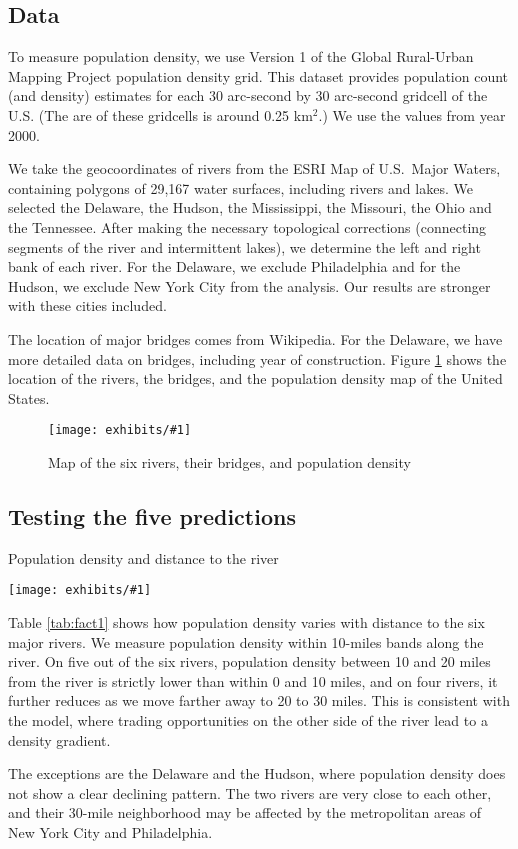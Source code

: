 \documentclass[12pt]{article}
\newcommand{\dofigure}[2]{\begin{figure}[h!]
\center %
\texttt{[image: exhibits/\#1]}
  \caption{#2\label{fig:#1}}
\end{figure}}
\newcommand{\dotable}[2]{\begin{table}[h!]
  \caption{#2\label{tab:#1}}
\center %
\texttt{[image: exhibits/\#1]}
\end{table}}
\begin{document}
\subsection{Data}

To measure population density, we use Version 1 of the Global Rural-Urban
Mapping Project population density grid. This dataset provides population
count (and density) estimates for each 30 arc-second by 30 arc-second
gridcell of the U.S. (The are of these gridcells is around 0.25 km${}^2$.) We use the values from year 2000.

We take the geocoordinates of rivers from the ESRI Map of U.S.~Major Waters,
containing polygons of 29,167 water surfaces, including rivers and lakes. We
selected the Delaware, the Hudson, the Mississippi, the Missouri, the Ohio
and the Tennessee. After making the necessary topological corrections
(connecting segments of the river and intermittent lakes), we determine the
left and right bank of each river. For the Delaware, we exclude Philadelphia
and for the Hudson, we exclude New York City from the analysis. Our results
are stronger with these cities included.

The location of major bridges comes from Wikipedia. For the Delaware, we
have more detailed data on bridges, including year of construction. Figure %
\ref{fig:rivermap} shows the location of the rivers, the bridges, and the
population density map of the United States.

\dofigure{rivermap}{Map of the six rivers, their bridges, and population density}

\subsection{Testing the five predictions}

\dotable{fact1}{Population density and distance to the river}

Table \ref{tab:fact1} shows how population density varies with distance to
the six major rivers. We measure population density within 10-miles bands
along the river. On five out of the six rivers, population density between
10 and 20 miles from the river is strictly lower than within 0 and 10 miles,
and on four rivers, it further reduces as we move farther away to 20 to 30
miles. This is consistent with the model, where trading opportunities on the
other side of the river lead to a density gradient.

The exceptions are the Delaware and the Hudson, where population density
does not show a clear declining pattern. The two rivers are very close to
each other, and their 30-mile neighborhood may be affected by the
metropolitan areas of New York City and Philadelphia.
\end{document}
